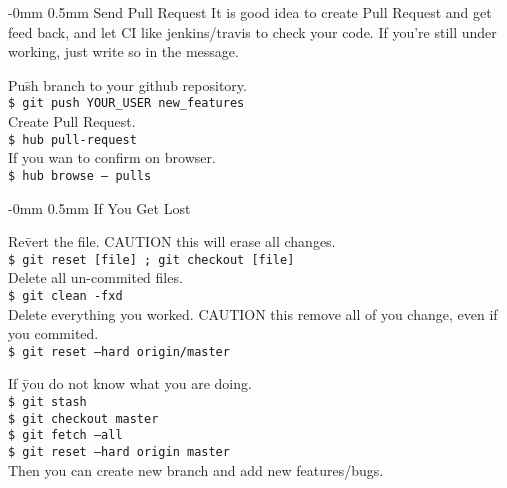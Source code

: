 \documentclass[10pt,landscape]{article}
\makeatletter
\renewcommand{\section}{\@startsection{section}{1}{0mm}%
                                {-0mm} %
                                {0.5mm}%
                                {\normalfont\large\bfseries}}
\makeatother
\begin{document}
\begin{multicols}{2}
\section{Send Pull Request}
\vspace{2.5mm}
It is good idea to create Pull Request and get
feed back, and let CI like jenkins/travis to check your code.
If you're still under working, just write so in the message.
\begin{tabbing}
Pu\=sh branch to your github repository.\\
\> \texttt{\$ git push YOUR\_USER new\_features}\\  
Create Pull Request.\\
\> \texttt{\$ hub pull-request}\\  
If you wan to confirm on browser.\\
\> \texttt{\$ hub browse -- pulls}\\  
\end{tabbing}

\vspace{-2.5mm}
\section{If You Get Lost}

\vspace{2.5mm}
\begin{tabbing}
Re\=vert the file. CAUTION this will erase all changes.\\
\> \texttt{\$ git reset [file] ; git checkout [file]}\\
Delete all un-commited files.\\
\> \texttt{\$ git clean -fxd}\\
Delete everything you worked. CAUTION this remove all of
you change, even if you commited.\\
\> \texttt{\$ git reset --hard origin/master}\\
\end{tabbing}

\begin{tabbing}
If \=you do not know what you are doing.\\
\> \texttt{\$ git stash}\\
\> \texttt{\$ git checkout master}\\
\> \texttt{\$ git fetch --all}\\
\> \texttt{\$ git reset --hard origin master}\\
Then you can create new branch and add new features/bugs.
\end{tabbing}


\end{multicols}
\end{document}
